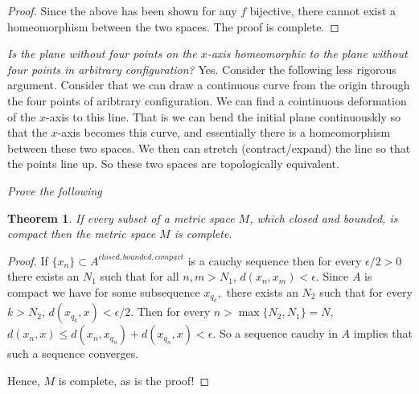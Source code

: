 \documentclass[letter]{article}
\newtheorem{theorem}{Theorem}
\newenvironment{menumerate}{%
  \edef\backupindent{\the\parindent}%
  \enumerate%
  \setlength{\parindent}{\backupindent}%
}{\endenumerate}
\begin{document}
\begin{menumerate}
\begin{proof}
			Since the above has been shown for any $f$ bijective, there cannot exist a homeomorphism between the two spaces. The proof is complete.
		\end{proof}


		\setcounter{enumi}{20}
		\item \emph{Is the plane without four points on the $x$-axis homeomorphic to the plane without four points in arbitrary configuration?} Yes. Consider the following less rigorous argument. Consider that we can draw a continuous curve from the origin through the four points of aribtrary configuration. We can find a cointinuous deformation of the $x$-axis to this line. That is we can bend the initial plane continuouskly so that the $x$-axis becomes this curve, and essentially there is a homeomorphism between these two spaces. We then can stretch (contract/expand) the line so that the points line up. So these two spaces are topologically equivalent. 
		\item \emph{Prove the following}
			\begin{theorem}
				If every subset of a metric space $M$, which closed and bounded, is compact then the metric space $M$ is complete.
			\end{theorem}
			\begin{proof}
				If $\{x_n\} \subset A^{closed,bounded,compact}$ is a cauchy sequence then for every $\epsilon/2 > 0$ there exists an $N_1$ such that for all $n,m > N_1$, $d(x_n,x_m)<\epsilon.$ Since $A$ is compact we have for some subsequence $x_{q_k},$ there exists an $N_2$ such that for every $k > N_2$, $d(x_{q_k}, x) < \epsilon/2.$ Then for every $n > \max\{N_2,N_1\} = N,$ $d(x_n,x) \leq d(x_n, x_{q_n}) + d(x_{q_n}, x) < \epsilon$. So a sequence cauchy in $A$ implies that such a sequence converges. 

				Hence, $M$ is complete, as is the proof!
			\end{proof}



\end{menumerate}
\end{document}
